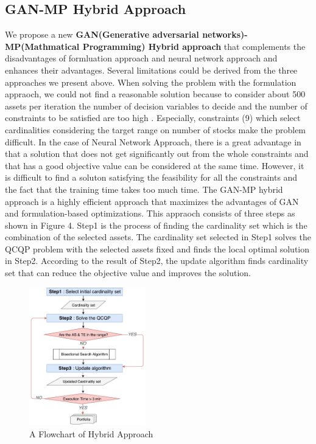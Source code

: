 \documentclass[11pt]{article}
\begin{document}
	
	
	
	
	\subsection{GAN-MP Hybrid Approach} %
	We propose a new \textbf{GAN(Generative adversarial networks)-MP(Mathmatical Programming) Hybrid approach} that complements the disadvantages of formluation approach and neural network approach and enhances their advantages. Several limitations could be derived from the three approaches we present above. When solving the problem with the formulation appraoch, we could not find a reasonable solution because to consider about 500 assets per iteration the number of decision variables to decide and the number of constraints to be satisfied are too high . Especially, constraints (9) which select cardinalities considering the target range on number of stocks make the problem difficult. 
	In the case of Neural Network Approach, there is a great advantage in that a solution that does not get significantly out from the whole constraints and that has a good objective value can be considered at the same time. However, it is difficult to find a soluton satisfying the feasibility for all the constraints and the fact that the training time takes too much time. The GAN-MP hybrid approach is a highly efficient approach that maximizes the advantages of GAN and formulation-based optimizations. This appraoch consists of three steps as shown in Figure 4. Step1 is the process of finding the cardinality set which is the combination of the selected assets. The cardinality set selected in Step1 solves the QCQP problem with the selected assets fixed and finds the local optimal solution in Step2. According to the result of Step2, the update algorithm finds cardinality set that can reduce the objective value and improves the solution.
	\begin{figure}[h] 
		\begin{center}
			\includegraphics[width=0.45\textwidth]{flowchart}
			\caption{A Flowchart of Hybrid Approach} \label{fig:flowchart}
		\end{center}
	\end{figure}
	
\end{document}
